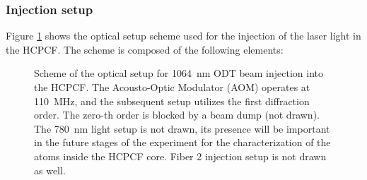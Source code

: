 \subsubsection{Injection setup}\label{subsec:injection_setup}
Figure \ref{fig:ODT_injection_setup} shows the optical setup scheme used for the injection of the laser light in the HCPCF.
The scheme is composed of the following elements:
\begin{figure}[h]
    \centering
    
    \caption{Scheme of the optical setup for 1064~nm ODT beam  injection into the HCPCF.
    The Acousto-Optic Modulator (AOM) operates at 110~MHz, and the subsequent setup utilizes the first diffraction order. The zero-th order is blocked by a beam dump (not drawn). 
    The 780~nm light setup is not drawn, its presence will be important in the future stages of the experiment for the characterization of the atoms inside the HCPCF core.
    Fiber 2 injection setup is not drawn as well.}
    \label{fig:ODT_injection_setup}
\end{figure}

